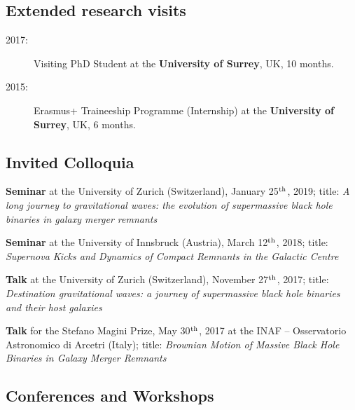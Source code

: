 \subsection*{Extended research visits}
\begin{description}

    \item[2017:] {  Visiting PhD Student } at the {\bf University of Surrey}, UK, 10 months. 

    \item[2015:] { Erasmus+ Traineeship Programme} (Internship) at the {\bf University of Surrey}, UK, 6 months.  

\end{description}

\subsection*{Invited Colloquia}

\begin{etaremune}

    \item {\bf Seminar} at the University of Zurich (Switzerland), January 25$^{\rm th}$, 2019; title: {\it A long journey to gravitational waves: the evolution of supermassive black hole binaries in galaxy merger remnants}

    \item {\bf Seminar} at the University of Innsbruck (Austria), March 12$^{\rm th}$, 2018; title: {\it Supernova Kicks and Dynamics of Compact Remnants in the Galactic Centre}

    \item {\bf Talk} at the University of Zurich (Switzerland), November 27$^{\rm th}$, 2017; title: {\it Destination gravitational waves: a journey of supermassive black hole binaries and their host galaxies}

    \item {\bf Talk} for the Stefano Magini Prize, May 30$^{\rm th}$, 2017 at the INAF – Osservatorio Astronomico di Arcetri (Italy); title: {\it Brownian Motion of Massive Black Hole Binaries in Galaxy Merger Remnants}

\end{etaremune}


\subsection*{Conferences and Workshops}

